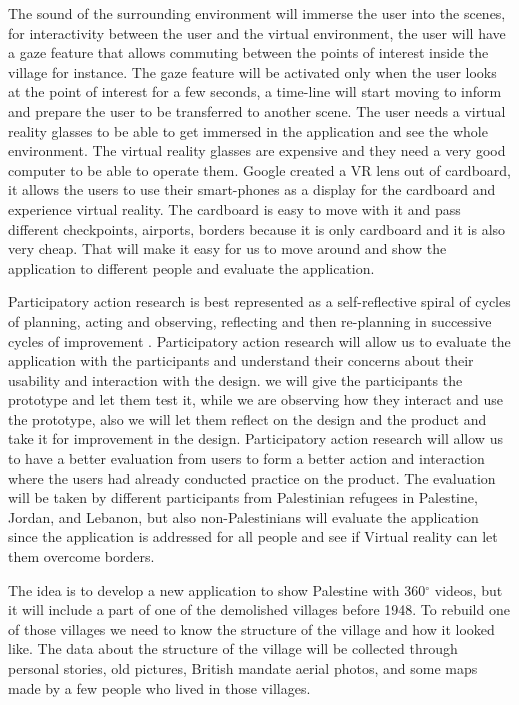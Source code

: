The sound of the surrounding environment will immerse the user into the scenes, for interactivity between the user and the virtual environment, the user will have a gaze feature that allows commuting between the points of interest inside the village for instance. The gaze feature will be activated only when the user looks at the point of interest for a few seconds, a time-line will start moving to inform and prepare the user to be transferred to another scene. The user needs a virtual reality glasses to be able to get immersed in the application and see the whole environment. The virtual reality glasses are expensive and they need a very good computer to be able to operate them. Google created a VR lens out of cardboard, it allows the users to use their smart-phones as a display for the cardboard and experience virtual reality. The cardboard is easy to move with it and pass different checkpoints, airports, borders because it is only cardboard and it is also very cheap. That will make it easy for us to move around and show the application to different people and evaluate the application.

Participatory action research is best represented as a self-reflective
spiral of cycles of planning, acting and observing, reflecting and then re-planning in successive cycles of improvement \citep{KemmisSdanMcTaggart1988}. Participatory action research will allow us to evaluate the application with the participants and understand their concerns about their usability and interaction with the design. we will give the participants the prototype and let them test it, while we are observing how they interact and use the prototype, also we will let them reflect on the design and the product and take it for improvement in the design. Participatory action research will allow us to have a better evaluation from users to form a better action and interaction where the users had already conducted practice on the product. The evaluation will be taken by different participants from Palestinian refugees in Palestine, Jordan, and Lebanon, but also non-Palestinians will evaluate the application since the application is addressed for all people and see if Virtual reality can let them overcome borders.





The idea is to develop a new application to show Palestine with 360$^{\circ}$ videos, but it will include a part of one of the demolished villages before 1948. To rebuild one of those villages we need to know the structure of the village and how it looked like. The data about the structure of the village will be collected through personal stories, old pictures, British mandate aerial photos, and some maps made by a few people who lived in those villages. 
  
